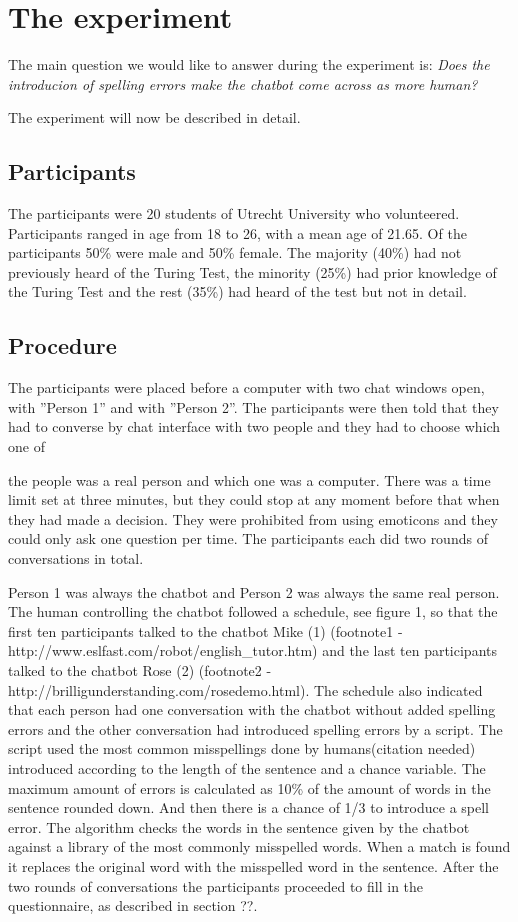 \section{The experiment}
The main question we would like to answer during the experiment is:
\textit{Does the introducion of spelling errors make the chatbot come across as more human?}

The experiment will now be described in detail.


\subsection{Participants}
The participants were 20 students of Utrecht University who volunteered. Participants ranged in age from 18 to 26, with a mean age of 21.65. Of the participants 50\% were male and 50\% female. The majority (40\%) had not previously heard of the Turing Test, the minority (25\%) had prior knowledge of the Turing Test and the rest (35\%) had heard of the test but not in detail.


\subsection{Procedure}
The participants were placed before a computer with two chat windows open, with ”Person 1” and with ”Person 2”. The participants were then told that they had to converse by chat interface with two people and they had to choose which one of

the people was a real person and which one was a computer. There was a time limit set at three minutes, but they could stop at any moment before that when they had made a decision. They were prohibited from using emoticons and they could only ask one question per time. The participants each did two rounds of conversations in total.

Person 1 was always the chatbot and Person 2 was always the same real person. The human controlling the chatbot followed a schedule, see figure 1, so that the first ten participants talked to the chatbot Mike (1) (footnote1 - http://www.eslfast.com/robot/english\_tutor.htm) and the last ten participants talked to the chatbot Rose (2) (footnote2 - http://brilligunderstanding.com/rosedemo.html). The schedule also indicated that each person had one conversation with the chatbot without added spelling errors and the other conversation had introduced spelling errors by a script. The script used the most common misspellings done by humans(citation needed) introduced according to the length of the sentence and a chance variable. The maximum amount of errors is calculated as 10\% of the amount of words in the sentence rounded down. And then there is a chance of 1/3 to introduce a spell error. The algorithm checks the words in the sentence given by the chatbot against a library of the most commonly misspelled words. When a match is found it replaces the original word with the misspelled word in the sentence. After the two rounds of conversations the participants proceeded to fill in the questionnaire, as described in section ??.


